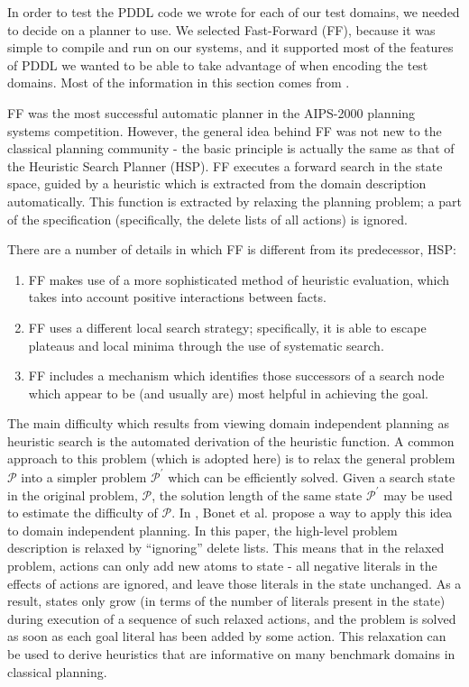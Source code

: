 In order to test the PDDL code we wrote for each of our test domains, we needed to decide on a planner to use. We selected Fast-Forward (FF), because it was simple to compile and run on our systems, and it supported most of the features of PDDL we wanted to be able to take advantage of when encoding the test domains. Most of the information in this section comes from \cite{Hoffmann:2001fk}.

FF was the most successful automatic planner in the AIPS-2000 planning systems competition. However, the general idea behind FF was not new to the classical planning community - the basic principle is actually the same as that of the Heuristic Search Planner (HSP). FF executes a forward search in the state space, guided by a heuristic which is extracted from the domain description automatically. This function is extracted by relaxing the planning problem; a part of the specification (specifically, the delete lists of all actions) is ignored. 

There are a number of details in which FF is different from its predecessor, HSP:
\begin{enumerate}
    \item FF makes use of a more sophisticated method of heuristic evaluation, which takes into account positive interactions between facts.
    \item FF uses a different local search strategy; specifically, it is able to escape plateaus and local minima through the use of systematic search.
    \item FF includes a mechanism which identifies those successors of a search node which appear to be (and usually are) most helpful in achieving the goal. 
\end{enumerate}

The main difficulty which results from viewing domain independent planning as heuristic search is the automated derivation of the heuristic function. A common approach to this problem (which is adopted here) is to relax the general problem $\mathcal{P}$ into a simpler problem $\mathcal{P}^\prime$ which can be efficiently solved. Given a search state in the original problem, $\mathcal{P}$, the solution length of the same state $\mathcal{P}^\prime$ may be used to estimate the difficulty of $\mathcal{P}$. In \cite{Bonet:1997uq}, Bonet et al. propose a way to apply this idea to domain independent planning. In this paper, the high-level problem description is relaxed by ``ignoring'' delete lists. This means that in the relaxed problem, actions can only add new atoms to state - all negative literals in the effects of actions are ignored, and leave those literals in the state unchanged. As a result, states only grow (in terms of the number of literals present in the state) during execution of a sequence of such relaxed actions, and the problem is solved as soon as each goal literal has been added by some action. This relaxation can be used to derive heuristics that are informative on many benchmark domains in classical planning.

